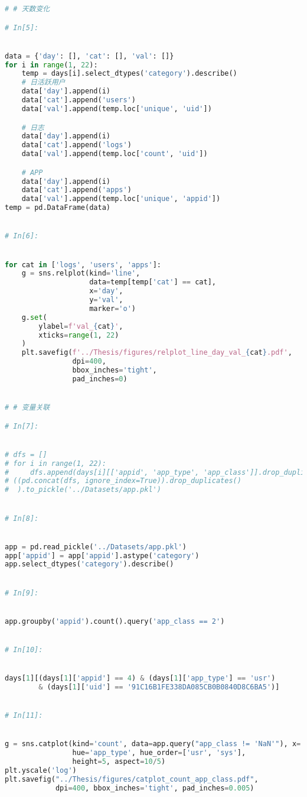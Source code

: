 \documentclass[withoutpreface,bwprint]{cumcmthesis}
\begin{document}
\begin{appendices}
\begin{lstlisting}[language=Python]
# # 天数变化

# In[5]:


data = {'day': [], 'cat': [], 'val': []}
for i in range(1, 22):
    temp = days[i].select_dtypes('category').describe()
    # 日活跃用户
    data['day'].append(i)
    data['cat'].append('users')
    data['val'].append(temp.loc['unique', 'uid'])

    # 日志
    data['day'].append(i)
    data['cat'].append('logs')
    data['val'].append(temp.loc['count', 'uid'])

    # APP
    data['day'].append(i)
    data['cat'].append('apps')
    data['val'].append(temp.loc['unique', 'appid'])
temp = pd.DataFrame(data)


# In[6]:


for cat in ['logs', 'users', 'apps']:
    g = sns.relplot(kind='line',
                    data=temp[temp['cat'] == cat],
                    x='day',
                    y='val',
                    marker='o')
    g.set(
        ylabel=f'val_{cat}',
        xticks=range(1, 22)
    )
    plt.savefig(f'../Thesis/figures/relplot_line_day_val_{cat}.pdf',
                dpi=400,
                bbox_inches='tight',
                pad_inches=0)


# # 变量关联

# In[7]:


# dfs = []
# for i in range(1, 22):
#     dfs.append(days[i][['appid', 'app_type', 'app_class']].drop_duplicates())
# ((pd.concat(dfs, ignore_index=True)).drop_duplicates()
#  ).to_pickle('../Datasets/app.pkl')


# In[8]:


app = pd.read_pickle('../Datasets/app.pkl')
app['appid'] = app['appid'].astype('category')
app.select_dtypes('category').describe()


# In[9]:


app.groupby('appid').count().query('app_class == 2')


# In[10]:


days[1][(days[1]['appid'] == 4) & (days[1]['app_type'] == 'usr')
        & (days[1]['uid'] == '91C16B1FE338DA085CB0B0840D8C6BA5')]


# In[11]:


g = sns.catplot(kind='count', data=app.query("app_class != 'NaN'"), x='app_class',
                hue='app_type', hue_order=['usr', 'sys'],
                height=5, aspect=10/5)
plt.yscale('log')
plt.savefig("../Thesis/figures/catplot_count_app_class.pdf",
            dpi=400, bbox_inches='tight', pad_inches=0.005)



\end{lstlisting}
\end{appendices}
\end{document}
